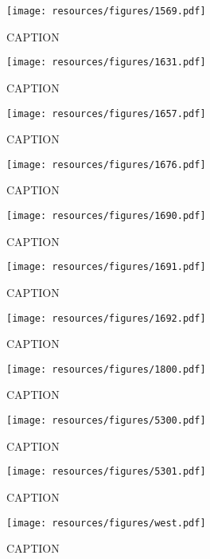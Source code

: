 \begin{figure}[ht]
\centering
\texttt{[image: resources/figures/1569.pdf]}
\caption{CAPTION}
\label{fig:appendix_1569}
\end{figure}

\begin{figure}[ht]
\centering
\texttt{[image: resources/figures/1631.pdf]}
\caption{CAPTION}
\label{fig:appendix_1631}
\end{figure}

\begin{figure}[ht]
\centering
\texttt{[image: resources/figures/1657.pdf]}
\caption{CAPTION}
\label{fig:appendix_1657}
\end{figure}

\begin{figure}[ht]
\centering
\texttt{[image: resources/figures/1676.pdf]}
\caption{CAPTION}
\label{fig:appendix_1676}
\end{figure}

\begin{figure}[ht]
\centering
\texttt{[image: resources/figures/1690.pdf]}
\caption{CAPTION}
\label{fig:appendix_1690}
\end{figure}

\begin{figure}[ht]
\centering
\texttt{[image: resources/figures/1691.pdf]}
\caption{CAPTION}
\label{fig:appendix_1691}
\end{figure}

\begin{figure}[ht]
\centering
\texttt{[image: resources/figures/1692.pdf]}
\caption{CAPTION}
\label{fig:appendix_1692}
\end{figure}

\begin{figure}[ht]
\centering
\texttt{[image: resources/figures/1800.pdf]}
\caption{CAPTION}
\label{fig:appendix_1800}
\end{figure}

\begin{figure}[ht]
\centering
\texttt{[image: resources/figures/5300.pdf]}
\caption{CAPTION}
\label{fig:appendix_5300}
\end{figure}

\begin{figure}[ht]
\centering
\texttt{[image: resources/figures/5301.pdf]}
\caption{CAPTION}
\label{fig:appendix_5301}
\end{figure}

\begin{figure}[ht]
\centering
\texttt{[image: resources/figures/west.pdf]}
\caption{CAPTION}
\label{fig:appendix_west}
\end{figure}
